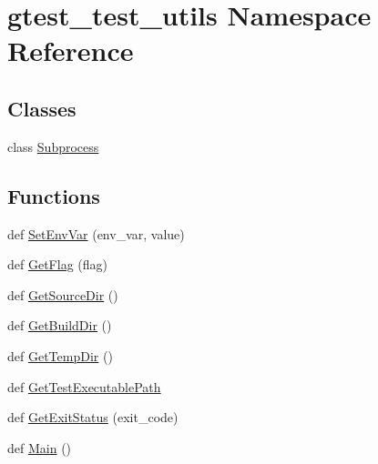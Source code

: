 \hypertarget{namespacegtest__test__utils}{}\section{gtest\+\_\+test\+\_\+utils Namespace Reference}
\label{namespacegtest__test__utils}
\subsection*{Classes}
\begin{DoxyCompactItemize}
\item 
class \hyperlink{classgtest__test__utils_1_1_subprocess}{Subprocess}
\end{DoxyCompactItemize}
\subsection*{Functions}
\begin{DoxyCompactItemize}
\item 
def \hyperlink{namespacegtest__test__utils_a616ee0f04e98e54b128cbe492def9bb1}{Set\+Env\+Var} (env\+\_\+var, value)
\item 
def \hyperlink{namespacegtest__test__utils_a052da74a5e39162480daf3a4d8eff9a6}{Get\+Flag} (flag)
\item 
def \hyperlink{namespacegtest__test__utils_aaff66cb0980804d8bd57dc719d4b5518}{Get\+Source\+Dir} ()
\item 
def \hyperlink{namespacegtest__test__utils_a1eacd9a471dfa6133028923ea755d22c}{Get\+Build\+Dir} ()
\item 
def \hyperlink{namespacegtest__test__utils_a25987e1cd76e93068b2afe6bac909d12}{Get\+Temp\+Dir} ()
\item 
def \hyperlink{namespacegtest__test__utils_a1bdf3cac86afa675ed37629b183048e9}{Get\+Test\+Executable\+Path}
\item 
def \hyperlink{namespacegtest__test__utils_acf8280de4dc027a28ffc9de43f245b50}{Get\+Exit\+Status} (exit\+\_\+code)
\item 
def \hyperlink{namespacegtest__test__utils_a5361b42d9c6843b5b117ead4d1c58cc5}{Main} ()
\end{DoxyCompactItemize}
